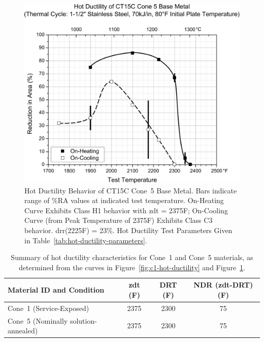 \begin{figure}[h!]
\setlength{\abovecaptionskip}{15pt}
\centering
\includegraphics[width=6in]{figures/hot-ductility/c5-hot-ductility-curve.pdf}
\caption[Hot Ductility Behavior of Cone~5 Base Metal.]{Hot Ductility Behavior of CT15C Cone~5 Base Metal.  Bars indicate range of \%RA values at indicated test temperature.  On-Heating Curve Exhibits Class H1 behavior with \gls{zdt} = 2375\textdegree{}F; On-Cooling Curve (from Peak Temperature of 2375\textdegree{}F) Exhibits Class C3 behavior.  \gls{drr}(2225\textdegree{}F) = 23\%. Hot Ductility Test Parameters Given in Table~\ref{tab:hot-ductility-parameters}.}
\label{fig:c5-hot-ductility}
\end{figure}

\begin{table}[h]
\caption{Summary of hot ductility characteristics for Cone~1 and Cone~5 materials, as determined from the curves in Figure~\ref{fig:c1-hot-ductility} and Figure~\ref{fig:c5-hot-ductility}.}
\begin{tabular}{ lccc }
\toprule
\textbf{Material ID and Condition} & \textbf{\gls{zdt} (F)} & \textbf{DRT (F)} & \textbf{NDR (\gls{zdt}-DRT) (F)} \\
\midrule
Cone~1 (Service-Exposed) & 2375 & 2300 & 75 \\
Cone~5 (Nominally solution-annealed) & 2375 & 2300 & 75 \\
\bottomrule
\end{tabular}
\label{tab:hot-ductility-results}
\end{table}



